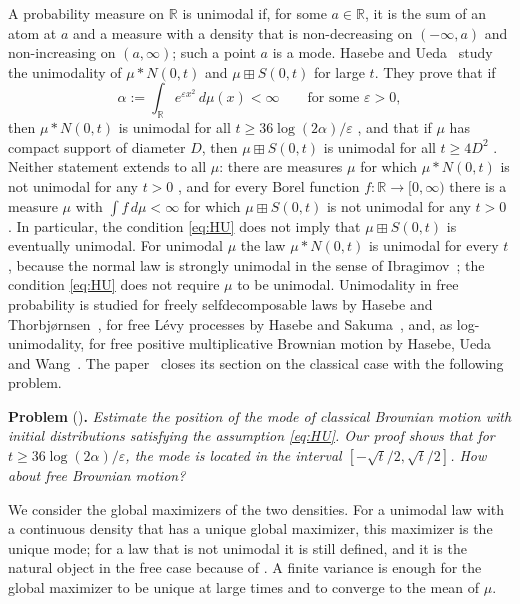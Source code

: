 \documentclass[11pt]{amsart}
\theoremstyle{definition}
\newcommand{\R}{\mathbb{R}}
\begin{document}
A probability measure on $\R$ is unimodal if, for some $a\in\R$, it is the sum of an atom at $a$ and a measure with
a density that is non-decreasing on $(-\infty,a)$ and non-increasing on $(a,\infty)$; such a point $a$ is a mode.
Hasebe and Ueda~\cite{HU} study the unimodality of $\mu*N(0,t)$ and $\mu\boxplus S(0,t)$ for large $t$. They prove
that if
\begin{equation}\label{eq:HU}
\alpha:=\int_\R e^{\varepsilon x^2}\,d\mu(x)<\infty\qquad\text{for some }\varepsilon>0,
\end{equation}
then $\mu*N(0,t)$ is unimodal for all $t\ge 36\log(2\alpha)/\varepsilon$ \cite[Theorem~4.3]{HU}, and that if $\mu$
has compact support of diameter $D$, then $\mu\boxplus S(0,t)$ is unimodal for all $t\ge 4D^2$
\cite[Theorem~3.2]{HU}. Neither statement extends to all $\mu$: there are measures $\mu$ for which $\mu*N(0,t)$ is
not unimodal for any $t>0$ \cite[Proposition~4.2]{HU}, and for every Borel function $f\colon\R\to[0,\infty)$ there
is a measure $\mu$ with $\int f\,d\mu<\infty$ for which $\mu\boxplus S(0,t)$ is not unimodal for any $t>0$
\cite[Proposition~3.4]{HU}. In particular, the condition \eqref{eq:HU} does not imply that $\mu\boxplus S(0,t)$ is
eventually unimodal. For unimodal $\mu$ the law $\mu*N(0,t)$ is unimodal for every $t$, because the normal law is
strongly unimodal in the sense of Ibragimov~\cite{Ibr}; the condition \eqref{eq:HU} does not require $\mu$ to be
unimodal. Unimodality in free probability is studied for freely selfdecomposable laws by Hasebe and
Thorbj\o rnsen~\cite{HT}, for free L\'evy processes by Hasebe and Sakuma~\cite{HS}, and, as log-unimodality, for
free positive multiplicative Brownian motion by Hasebe, Ueda and Wang~\cite{HUW}. The paper~\cite{HU} closes its section on the classical case with the following problem.

\medskip
\noindent\textbf{Problem} (\cite[Problem~4.6]{HU})\textbf{.} \emph{Estimate the position of the mode of classical
Brownian motion with initial distributions satisfying the assumption \eqref{eq:HU}. Our proof shows that for
$t\ge 36\log(2\alpha)/\varepsilon$, the mode is located in the interval $[-\sqrt t/2,\sqrt t/2]$. How about free
Brownian motion?}
\medskip

We consider the global maximizers of the two densities. For a unimodal law with a continuous density that has a
unique global maximizer, this maximizer is the unique mode; for a law that is not unimodal it is still defined, and
it is the natural object in the free case because of \cite[Proposition~3.4]{HU}. A finite variance is enough for
the global maximizer to be unique at large times and to converge to the mean of $\mu$.
\end{document}
